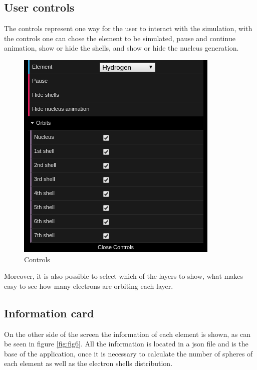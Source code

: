 \documentclass{article}
\begin{document}
\subsection{User controls}

The controls represent one way for the user to interact with the simulation, with the controls one can chose the element to be simulated, pause and continue animation, show or hide the shells, and show or hide the nucleus generation.

\begin{figure}[!ht]
\centering
\includegraphics[scale=0.4]{controls.png}
\caption{Controls}
\label{fig:fig4}
\end{figure}

Moreover, it is also possible to select which of the layers to show, what makes easy to see how many electrons are orbiting each layer.

\subsection{Information card}

On the other side of the screen the information of each element is shown, as can be seen in figure \ref{fig:fig6}. All the information is located in a json file and is the base of the application, once it is necessary to calculate the number of spheres of each element as well as the electron shells distribution.
\end{document}

